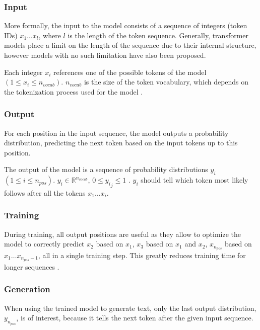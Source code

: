 \subsubsection{Input}

More formally, the input to the model consists of a sequence of integers (token IDs) $x_1 \ldots x_l$, where $l$ is the length of the token sequence.
Generally, transformer models place a limit on the length of the sequence due to their internal structure, however models with no such limitation have also been proposed. \cite{su2023roformer}

Each integer $x_i$ references one of the possible tokens of the model $(1 \leq x_i \leq n_{vocab})$. $n_{vocab}$ is the size of the token vocabulary, which depends on the tokenization process used for the model .

\subsubsection{Output}

\label{transformer:output}

For each position in the input sequence, the model outputs a probability distribution, predicting the next token based on the input tokens up to this position. 

The output of the model is a sequence of probability distributions $y_i$ $(1 \leq i \leq n_{pos})$. $y_i \in \mathbb{R}^{n_{vocab}}$, $0 \leq {y_i}_j \leq 1$  \cite{HuggingFaceGPT2}.
$y_i$ should tell which token most likely follows after all the tokens $x_1 \ldots x_i$.

\subsubsection{Training}

During training, all output positions are useful as they allow to optimize the model to correctly predict $x_2$ based on $x_1$,
$x_3$ based on $x_1$ and $x_2$, $x_{n_{pos}}$ based on $x_1 \ldots x_{n_{pos}-1}$, all in a single training step. This greatly reduces training time for longer sequences \cite{alammar-gpt2}.

\subsubsection{Generation}

When using the trained model to generate text, only the last output distribution, $y_{n_{pos}}$, is of interest, because
it tells the next token after the given input sequence. \cite{Mao2021Autoregressive}

